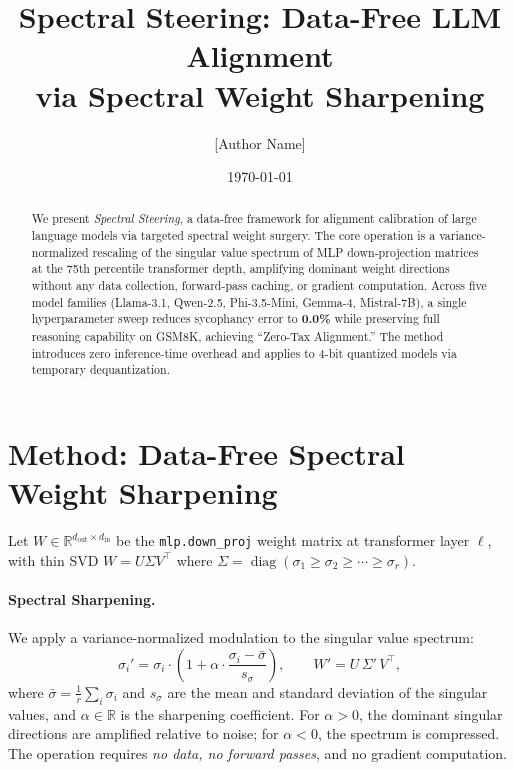 \documentclass{article}
\title{Spectral Steering: Data-Free LLM Alignment\\via Spectral Weight Sharpening}
\author{[Author Name]}
\affil{[Institution]}
\date{\today}
\begin{document}
\maketitle

\begin{abstract}
We present \emph{Spectral Steering}, a data-free framework for alignment calibration of large language models via targeted spectral weight surgery. The core operation is a variance-normalized rescaling of the singular value spectrum of MLP down-projection matrices at the 75th percentile transformer depth, amplifying dominant weight directions without any data collection, forward-pass caching, or gradient computation. Across five model families (Llama-3.1, Qwen-2.5, Phi-3.5-Mini, Gemma-4, Mistral-7B), a single hyperparameter sweep reduces sycophancy error to \textbf{0.0\%} while preserving full reasoning capability on GSM8K, achieving ``Zero-Tax Alignment.'' The method introduces zero inference-time overhead and applies to 4-bit quantized models via temporary dequantization.
\end{abstract}

\section{Method: Data-Free Spectral Weight Sharpening}

Let $W \in \mathbb{R}^{d_{\mathrm{out}} \times d_{\mathrm{in}}}$ be the \texttt{mlp.down\_proj} weight matrix at transformer layer $\ell$, with thin SVD $W = U\Sigma V^\top$ where $\Sigma = \operatorname{diag}(\sigma_1 \geq \sigma_2 \geq \cdots \geq \sigma_r)$.

\paragraph{Spectral Sharpening.}
We apply a variance-normalized modulation to the singular value spectrum:
\begin{equation}
  \sigma_i' = \sigma_i \cdot \!\left(1 + \alpha \cdot \frac{\sigma_i - \bar{\sigma}}{s_\sigma}\right),
  \qquad W' = U\,\Sigma'\,V^\top,
  \label{eq:sharpening}
\end{equation}
where $\bar{\sigma} = \frac{1}{r}\sum_i \sigma_i$ and $s_\sigma$ are the mean and standard deviation of the singular values, and $\alpha \in \mathbb{R}$ is the sharpening coefficient. For $\alpha > 0$, the dominant singular directions are amplified relative to noise; for $\alpha < 0$, the spectrum is compressed. The operation requires \emph{no data, no forward passes}, and no gradient computation.
\end{document}
